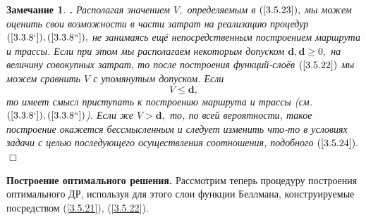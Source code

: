 \documentclass[12pt,twoside]{report}
\newcommand{\bfn}{\begin{equation}}
\newcommand{\efn}{\end{equation}}
\newcounter{theo}
\newcounter{zam}
\newtheorem{zam}{Замечание}[section]
\newcommand{\TL}{\mbox{\bf{$\!\!$.}}}
\begin{document}
{\begin{zam}\label{z3.5.1}{\TL} Располагая значением $V,$ определяемым в $(\ref{3.5.23}),$
мы можем оценить свои возможности в части затрат на реализацию процедур $(\ref{3.3.8`}),
(\ref{3.3.8``}),$ не занимаясь ещё непосредственным построением маршрута и трассы. Если при
этом мы располагаем некоторым допуском $\mathbf{d}, \mathbf{d}\geqslant 0,$ на величину
совокупных затрат, то после построения функций-слоёв $(\ref{3.5.22})$ мы можем сравнить $V$
с упомянутым допуском. Если
\bfn\label{3.5.24}V \leqslant \mathbf{d},
\efn
то имеет смысл приступать к построению маршрута и трассы (см. $(\ref{3.3.8`}),
(\ref{3.3.8``})$). Если же $V > \mathbf{d},$ то, по всей вероятности, такое построение
окажется бессмысленным и следует изменить что-то в условиях задачи с целью последующего
осуществления соотношения, подобного $(\ref{3.5.24}).$
\hfill $\Box$ \end{zam}

{\bf Построение оптимального решения.} Рассмотрим теперь процедуру построения оптимального
ДР, используя для этого слои функции Беллмана, конструируемые посредством (\ref{3.5.21}),
(\ref{3.5.22}).

}
\end{document}
